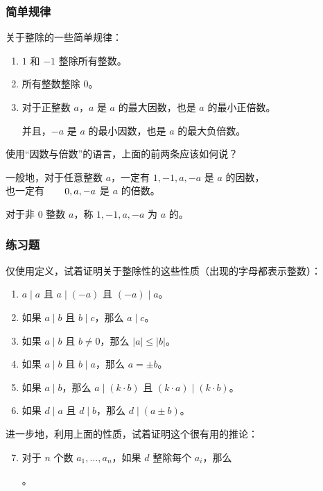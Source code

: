 \begin{frame}
  \frametitle{简单规律}
  关于整除的一些简单规律：
  \pause
  \begin{enumerate}
    \item $1$ 和 $-1$ 整除所有整数。
    \pause
    \item 所有整数整除 $0$。
    \pause
    \item 对于\alert{正}整数 $a$，$a$ 是 $a$ 的最大因数，也是 $a$ 的最小\alert{正}倍数。
    
    并且，$-a$ 是 $a$ 的最小因数，也是 $a$ 的最大负倍数。
  \end{enumerate}
  \pause
  使用“因数与倍数”的语言，上面的前两条应该如何说？
  \pause
  
  \emptyline
  一般地，对于任意整数 $a$，一定有 $1, -1, a, -a$ 是 $a$ 的因数，\\
  \-\hspace{10em}\hphantom{ $a$}也一定有 $\hphantom{0, -{}}0, a, -a$ 是 $a$ 的倍数。
  
  对于非 $0$ 整数 $a$，称 $1, -1, a, -a$ 为 $a$ 的。
\end{frame}
\begin{frame}
  \frametitle{练习题}
  仅使用定义，试着证明关于整除性的这些性质（出现的字母都表示整数）：
  \pause
  \begin{enumerate}
    \setlength{\itemsep}{2pt}
    \item $a \mid a$ 且 $a \mid (-a)$ 且 $(-a) \mid a$。
    \pause
    \item 如果 $a \mid b$ 且 $b \mid c$，那么 $a \mid c$。
    \pause
    \item 如果 $a \mid b$ 且 $b \ne 0$，那么 $\lvert a \rvert \le \lvert b \rvert$。
    \pause
    \item 如果 $a \mid b$ 且 $b \mid a$，那么 $a = \pm b$。
    \pause
    \item 如果 $a \mid b$，那么 $a \mid (k \cdot b)$ 且 $(k \cdot a) \mid (k \cdot b)$。
    \pause
    \item 如果 $d \mid a$ 且 $d \mid b$，那么 $d \mid (a \pm b)$。
  \end{enumerate}
  \pause
  进一步地，利用上面的性质，试着证明这个很有用的推论：
  \pause
  \begin{enumerate}
    \setcounter{enumi}{6}
    \item 对于 $n$ 个数 $a_1, \ldots, a_n$，如果 $d$ 整除每个 $a_i$，那么
    \begin{center}
      。
    \end{center}
  \end{enumerate}
\end{frame}
